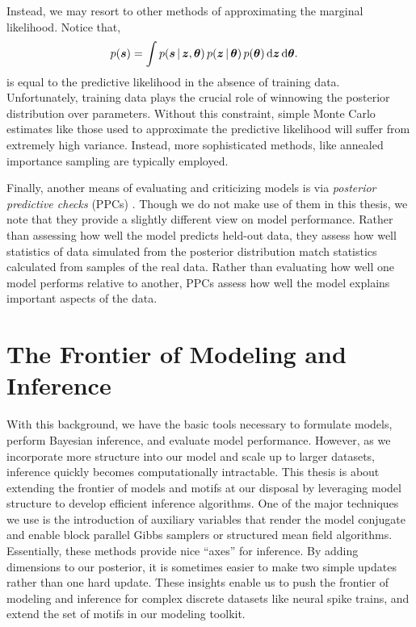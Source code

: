 Instead, we may resort to other methods of approximating the marginal
likelihood. Notice that,
\begin{align}
  \label{eq:marginal_likelihood}
  p(\boldsymbol{s})
  &= \int p(\boldsymbol{s} \,|\, \boldsymbol{z}, \boldsymbol{\theta}) \,
  p(\boldsymbol{z} \,|\, \boldsymbol{\theta}) \,
  p(\boldsymbol{\theta}) \,
  \mathrm{d}\boldsymbol{z} \, \mathrm{d} \boldsymbol{\theta}.
\end{align}
is equal to the predictive likelihood
in the absence of training data. Unfortunately, training data plays the crucial
role of winnowing the posterior distribution over parameters. Without this constraint, simple Monte Carlo estimates
like those used to approximate the predictive likelihood will suffer from
extremely high variance. Instead, more sophisticated methods, like annealed
importance sampling \cite{neal2001annealed} are typically employed. 

Finally, another means of evaluating and criticizing models is via
\emph{posterior predictive checks} (PPCs) \cite{box1980sampling,
  Gelman13, blei2014build}.  Though we do not make use of them in this
thesis, we note that they provide a slightly different view on model
performance. Rather than assessing how well the model predicts
held-out data, they assess how well statistics of data simulated from
the posterior distribution match statistics calculated from samples of
the real data. Rather than evaluating how well one model performs
relative to another, PPCs assess how well the model explains important
aspects of the data.

\section{The Frontier of Modeling and Inference}
With this background, we have the basic tools necessary to formulate
models, perform Bayesian inference, and evaluate model performance.
However, as we incorporate more structure into our model and scale up
to larger datasets, inference quickly becomes computationally
intractable. This thesis is about extending the frontier of models and
motifs at our disposal by leveraging model structure to develop
efficient inference algorithms. One of the major techniques we use is
the introduction of auxiliary variables that render the model
conjugate and enable block parallel Gibbs samplers or structured mean
field algorithms. Essentially, these methods provide nice ``axes''
for inference. By adding dimensions to our posterior, it is sometimes
easier to make two simple updates rather than one hard update.  These
insights enable us to push the frontier of modeling and inference for
complex discrete datasets like neural spike trains, and extend the
set of motifs in our modeling toolkit.
